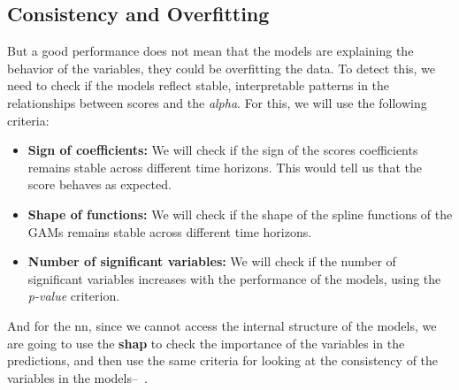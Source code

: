 \documentclass[11pt,english,a4paper,hidelinks]{book}
\begin{document}
\subsection{Consistency and Overfitting}
But a good performance does not mean that the models are explaining the behavior of the variables, they could be overfitting the data. To detect this, we need to check if the models reflect stable, interpretable patterns in the relationships between scores and the \textit{alpha}. For this, we will use the following criteria:
\begin{itemize}
    \item \textbf{Sign of coefficients:} We will check if the sign of the scores coefficients remains stable across different time horizons. This would tell us that the score behaves as expected. 
    \item \textbf{Shape of functions:} We will check if the shape of the spline functions of the GAMs remains stable across different time horizons. 
    \item \textbf{Number of significant variables:} We will check if the number of significant variables increases with the performance of the models, using the \textit{p-value} criterion.
\end{itemize}

\noindent And for the \acrshort{nn}, since we cannot access the internal structure of the models, we are going to use the \textbf{\gls{shap}} to check the importance of the variables in the predictions, and then use the same criteria for looking at the consistency of the variables in the models--~\textcite{lundberg2017unified}.
\end{document}

